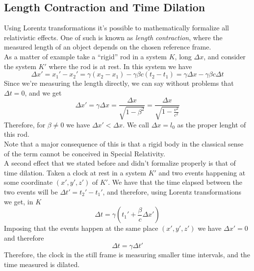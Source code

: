 \documentclass[../admech.tex]{subfiles}
\begin{document}
\subsection{Length Contraction and Time Dilation}
Using Lorentz transformations it's possible to mathematically formalize all relativistic effects. One of such is known as \emph{length contraction}, where the measured length of an object depends on the chosen reference frame.\\
As a matter of example take a ``rigid'' rod in a system $K$, long $\Delta x$, and consider the system $K'$ where the rod is at rest. In this system we have
\begin{equation}
	\Delta x'=x_1'-x_2'=\gamma(x_2-x_1)-\gamma\beta c(t_2-t_1)=\gamma\Delta x-\gamma\beta c\Delta t
	\label{eq:lengcontr}
\end{equation}
Since we're measuring the length directly, we can say without problems that $\Delta t=0$, and we get
\begin{equation}
	\Delta x'=\gamma\Delta x=\frac{\Delta x}{\sqrt{1-\beta^2}}=\frac{\Delta x}{\sqrt{1-\frac{v^2}{c^2}}}
	\label{eq:lengthcontr}
\end{equation}
Therefore, for $\beta\ne0$ we have $\Delta x'<\Delta x$. We call $\Delta x=l_0$ as the proper lenght of this rod.\\
Note that a major consequence of this is that a rigid body in the classical sense of the term cannot be conceived in Special Relativity.\\
A second effect that we stated before and didn't formalize properly is that of time dilation. Taken a clock at rest in a system $K'$ and two events happening at some coordinate $(x',y',z')$ of $K'$. We have that the time elapsed between the two events will be $\Delta t'=t_2'-t_1'$, and therefore, using Lorentz transformations we get, in $K$
\begin{equation}
	\Delta t=\gamma\left( t_1'+\frac{\beta}{c}\Delta x' \right)
	\label{eq:deltatK}
\end{equation}
Imposing that the events happen at the same place $(x',y',z')$ we have $\Delta x'=0$ and therefore
\begin{equation}
	\Delta t=\gamma\Delta t'
	\label{eq:timedil}
\end{equation}
Therefore, the clock in the still frame is measuring smaller time intervals, and the time measured is dilated.\\
\end{document}
